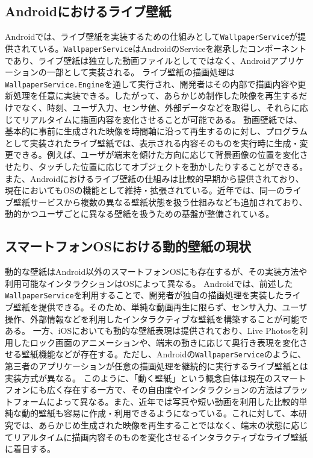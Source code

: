 

\subsection{Androidにおけるライブ壁紙}
Androidでは、ライブ壁紙を実装するための仕組みとして\texttt{WallpaperService}が提供されている\cite{android_wallpaper_service}。\texttt{WallpaperService}はAndroidのServiceを継承したコンポーネントであり、ライブ壁紙は独立した動画ファイルとしてではなく、Androidアプリケーションの一部として実装される。
ライブ壁紙の描画処理は\texttt{WallpaperService.Engine}を通して実行され、開発者はその内部で描画内容や更新処理を任意に実装できる。したがって、あらかじめ制作した映像を再生するだけでなく、時刻、ユーザ入力、センサ値、外部データなどを取得し、それらに応じてリアルタイムに描画内容を変化させることが可能である。
動画壁紙では、基本的に事前に生成された映像を時間軸に沿って再生するのに対し、プログラムとして実装されたライブ壁紙では、表示される内容そのものを実行時に生成・変更できる。例えば、ユーザが端末を傾けた方向に応じて背景画像の位置を変化させたり、タッチした位置に応じてオブジェクトを動かしたりすることができる。
また、Androidにおけるライブ壁紙の仕組みは比較的早期から提供されており、現在においてもOSの機能として維持・拡張されている。近年では、同一のライブ壁紙サービスから複数の異なる壁紙状態を扱う仕組みなども追加されており、動的かつユーザごとに異なる壁紙を扱うための基盤が整備されている\cite{android16_wallpaper}。

\subsection{スマートフォンOSにおける動的壁紙の現状}
動的な壁紙はAndroid以外のスマートフォンOSにも存在するが、その実装方法や利用可能なインタラクションはOSによって異なる。
Androidでは、前述した\texttt{WallpaperService}を利用することで、開発者が独自の描画処理を実装したライブ壁紙を提供できる。そのため、単純な動画再生に限らず、センサ入力、ユーザ操作、外部情報などを利用したインタラクティブな壁紙を構築することが可能である。
一方、iOSにおいても動的な壁紙表現は提供されており、Live Photosを利用したロック画面のアニメーションや、端末の動きに応じて奥行き表現を変化させる壁紙機能などが存在する\cite{apple_live_photo_wallpaper,apple_ios26_spatial_scenes}。ただし、Androidの\texttt{WallpaperService}のように、第三者のアプリケーションが任意の描画処理を継続的に実行するライブ壁紙とは実装方式が異なる。
このように、「動く壁紙」という概念自体は現在のスマートフォンにも広く存在する一方で、その自由度やインタラクションの方法はプラットフォームによって異なる。また、近年では写真や短い動画を利用した比較的単純な動的壁紙も容易に作成・利用できるようになっている。これに対して、本研究では、あらかじめ生成された映像を再生することではなく、端末の状態に応じてリアルタイムに描画内容そのものを変化させるインタラクティブなライブ壁紙に着目する。


